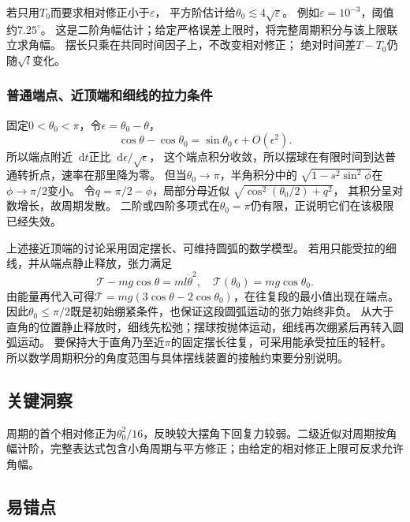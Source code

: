 \documentclass[UTF8,fontset=fandol,a4paper,11pt]{ctexart}
\newcommand{\dd}{\mathop{}\!\mathrm{d}}
\begin{document}
若只用$T_0$而要求相对修正小于$\varepsilon$，
平方阶估计给$\theta_0\lesssim4\sqrt\varepsilon$。
例如$\varepsilon=10^{-3}$，阈值约$7.25^\circ$。
这是二阶角幅估计；给定严格误差上限时，将完整周期积分与该上限联立求角幅。
摆长只乘在共同时间因子上，不改变相对修正；
绝对时间差$T-T_0$仍随$\sqrt l$变化。

\subsubsection*{普通端点、近顶端和细线的拉力条件}
固定$0<\theta_0<\pi$，令$\epsilon=\theta_0-\theta$，
\[
\cos\theta-\cos\theta_0=\sin\theta_0\,\epsilon+O(\epsilon^2).
\]
所以端点附近$\dd t$正比$\dd\epsilon/\sqrt\epsilon$，
这个端点积分收敛，所以摆球在有限时间到达普通转折点，速率在那里降为零。
但当$\theta_0\to\pi$，半角积分中的
$\sqrt{1-s^2\sin^2\phi}$在$\phi\to\pi/2$变小。
令$q=\pi/2-\phi$，局部分母近似
$\sqrt{\cos^2(\theta_0/2)+q^2}$，
其积分呈对数增长，故周期发散。
二阶或四阶多项式在$\theta_0=\pi$仍有限，正说明它们在该极限已经失效。

上述接近顶端的讨论采用固定摆长、可维持圆弧的数学模型。
若用只能受拉的细线，并从端点静止释放，张力满足
\[
\mathcal T-mg\cos\theta=ml\dot\theta^2,
\quad\mathcal T(\theta_0)=mg\cos\theta_0.
\]
由能量再代入可得$\mathcal T=mg(3\cos\theta-2\cos\theta_0)$，在往复段的最小值出现在端点。
因此$\theta_0\le\pi/2$既是初始绷紧条件，也保证这段圆弧运动的张力始终非负。
从大于直角的位置静止释放时，细线先松弛；摆球按抛体运动，细线再次绷紧后再转入圆弧运动。
要保持大于直角乃至近$\pi$的固定摆长往复，可采用能承受拉压的轻杆。
所以数学周期积分的角度范围与具体摆线装置的接触约束要分别说明。




\subsection*{关键洞察}

周期的首个相对修正为$\theta_0^2/16$，反映较大摆角下回复力较弱。二级近似对周期按角幅计阶，完整表达式包含小角周期与平方修正；由给定的相对修正上限可反求允许角幅。




\subsection*{易错点}
\end{document}
